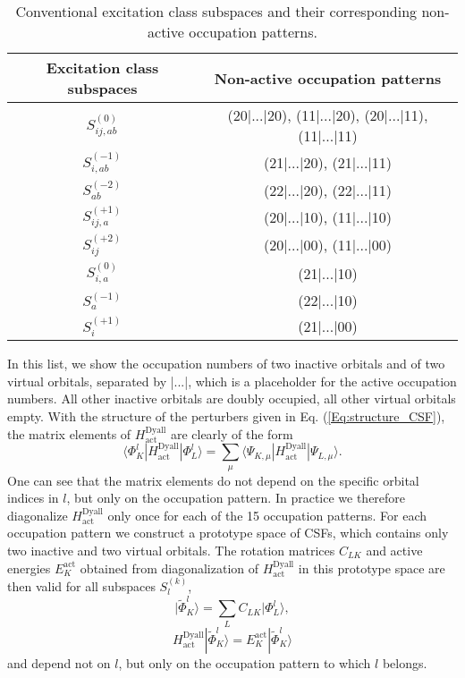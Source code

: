 \begin{table}
\centering
\small
\ttabbox
{\caption{Conventional excitation class subspaces and their corresponding non-active occupation patterns.}
\label{Tab:ExcitationClasses}}
{\begin{tabular}{cc}
\hline\hline
Excitation class subspaces &	Non-active occupation patterns \\ \hline
$S_{ij,ab}^{(0)}$	&(20|...|20), (11|...|20), (20|...|11), (11|...|11) \\
$S_{i,ab}^{( - 1)}$ &	(21|...|20), (21|...|11) \\
$S_{ab}^{( - 2)}$	& (22|...|20), (22|...|11) \\
$S_{ij,a}^{( + 1)}$	& (20|...|10), (11|...|10) \\
$S_{ij}^{( + 2)}$	& (20|...|00), (11|...|00) \\
$S_{i,a}^{(0)}$	& (21|...|10) \\
$S_a^{( - 1)}$	& (22|...|10) \\
$S_i^{( + 1)}$	& (21|...|00) \\ \hline\hline
\end{tabular}}
\end{table}
In this list, we show the occupation numbers of two inactive orbitals and of two virtual orbitals, separated by |...|, which is a placeholder for the active occupation numbers. All other inactive orbitals are doubly occupied, all other virtual orbitals empty. With the structure of the perturbers given in Eq. (\ref{Eq:structure_CSF}), the matrix elements of $H_{{\text{act}}}^{{\text{Dyall}}}$ are clearly of the form
\begin{equation}
\label{Eq:HDyallact_ME}
\langle {\Phi _K^l|H_{{\text{act}}}^{{\text{Dyall}}}|\Phi _L^l} \rangle  = \sum\limits_\mu  {\langle {\Psi _{K,\mu }^{}|H_{{\text{act}}}^{{\text{Dyall}}}|\Psi _{L,\mu }^{}} \rangle }. 
\end{equation}					
One can see that the matrix elements do not depend on the specific orbital indices in $l$, but only on the occupation pattern. In practice we therefore diagonalize $H_{{\text{act}}}^{{\text{Dyall}}}$ only once for each of the 15 occupation patterns. For each occupation pattern we construct a prototype space of CSFs, which contains only two inactive and two virtual orbitals. The rotation matrices ${C_{LK}}$ and active energies $E_K^{{\text{act}}}$ obtained from diagonalization of $H_{{\text{act}}}^{{\text{Dyall}}}$ in this prototype space are then valid for all subspaces $S_l^{(k)}$,
\begin{equation}
 |{\tilde \Phi _K^l} \rangle  = \sum\limits_L {C_{LK}^{}| {\Phi _L^l} \rangle },
 \end{equation}
 \begin{equation}
 H^\text{Dyall}_\text{act} |\tilde{\Phi}_K^l\rangle = E_K^\text{act} |\tilde{\Phi}_K^l\rangle
\end{equation}									
and depend not on $l$, but only on the occupation pattern to which $l$ belongs.
